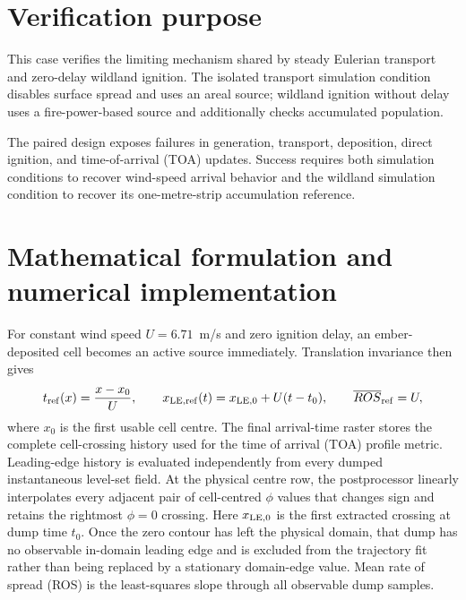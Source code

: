 \section{Verification purpose}

This case verifies the limiting mechanism shared by steady Eulerian transport and zero-delay wildland ignition. The isolated transport simulation condition disables surface spread and uses an areal source; wildland ignition without delay uses a fire-power-based source and additionally checks accumulated population.

The paired design exposes failures in generation, transport, deposition, direct ignition, and time-of-arrival (TOA) updates. Success requires both simulation conditions to recover wind-speed arrival behavior and the wildland simulation condition to recover its one-metre-strip accumulation reference.

\section{Mathematical formulation and numerical implementation}
For constant wind speed $U=6.71$~m/s and zero ignition delay, an ember-deposited
cell becomes an active source immediately. Translation invariance then gives
\begin{equation}
 t_{\rm ref}(x)=\frac{x-x_0}{U},\qquad
 x_{\rm LE,ref}(t)=x_{\rm LE,0}+U(t-t_0),\qquad
 \overline{ROS}_{\rm ref}=U,
 \label{eq:transport}
\end{equation}
where $x_0$ is the first usable cell centre. The final arrival-time raster stores
the complete cell-crossing history used for the time of arrival (TOA) profile metric. Leading-edge
history is evaluated independently from every dumped instantaneous level-set
field. At the physical centre row, the postprocessor linearly interpolates every
adjacent pair of cell-centred $\phi$ values that changes sign and retains the
rightmost $\phi=0$ crossing. Here $x_{\rm LE,0}$ is the first extracted crossing
at dump time $t_0$. Once the zero contour has left the physical domain, that dump
has no observable in-domain leading edge and is excluded from the trajectory fit
rather than being replaced by a stationary domain-edge value. Mean rate of spread (ROS) is the
least-squares slope through all observable dump samples.


